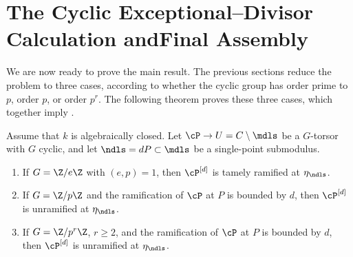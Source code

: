\section[The Cyclic Exceptional--Divisor Calculation and Final Assembly]
{The Cyclic Exceptional--Divisor Calculation and\newline Final Assembly}

We are now ready to prove the main result. The previous sections reduce the
problem to three cases, according to whether the cyclic group has order prime
to $p$, order $p$, or order $p^r$. The following theorem proves these three
cases, which together imply .

\begin{theorem}
\label{theorem:cyclic_cases_after_blowup}
\label{theorem:ramification_after_blowup_P1}
\label{cor:ramification_after_blowup_is_tame}
\label{theorem:ramification_after_blowup_is_tame_for_p_power}
Assume that $k$ is algebraically closed.
Let $\cP\to U=C\setminus\mdls$ be a $G$-torsor with $G$ cyclic, and let
$\ndls=dP\subset\mdls$ be a single-point submodulus.
\begin{enumerate}
    \item If $G=\Z/e\Z$ with $(e,p)=1$, then $\cP^{[d]}$ is tamely
    ramified at $\eta_\ndls$.
    \item If $G=\Z/p\Z$ and the ramification of $\cP$ at $P$ is bounded
    by $d$, then $\cP^{[d]}$ is unramified at $\eta_\ndls$.
    \item If $G=\Z/p^r\Z$, $r\geq2$, and the ramification of $\cP$ at
    $P$ is bounded by $d$, then $\cP^{[d]}$ is unramified at
    $\eta_\ndls$.
\end{enumerate}
\end{theorem}

